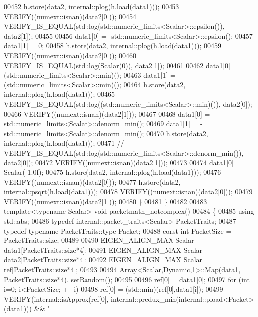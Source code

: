 \begin{DoxyCode}
00452     h.store(data2, internal::plog(h.load(data1)));
00453     VERIFY((numext::isnan)(data2[0]));
00454     VERIFY\_IS\_EQUAL(std::log(std::numeric\_limits<Scalar>::epsilon()), data2[1]);
00455 
00456     data1[0] = -std::numeric\_limits<Scalar>::epsilon();
00457     data1[1] = 0;
00458     h.store(data2, internal::plog(h.load(data1)));
00459     VERIFY((numext::isnan)(data2[0]));
00460     VERIFY\_IS\_EQUAL(std::log(Scalar(0)), data2[1]);
00461 
00462     data1[0] = (std::numeric\_limits<Scalar>::min)();
00463     data1[1] = -(std::numeric\_limits<Scalar>::min)();
00464     h.store(data2, internal::plog(h.load(data1)));
00465     VERIFY\_IS\_EQUAL(std::log((std::numeric\_limits<Scalar>::min)()), data2[0]);
00466     VERIFY((numext::isnan)(data2[1]));
00467 
00468     data1[0] = std::numeric\_limits<Scalar>::denorm\_min();
00469     data1[1] = -std::numeric\_limits<Scalar>::denorm\_min();
00470     h.store(data2, internal::plog(h.load(data1)));
00471     \textcolor{comment}{// VERIFY\_IS\_EQUAL(std::log(std::numeric\_limits<Scalar>::denorm\_min()), data2[0]);}
00472     VERIFY((numext::isnan)(data2[1]));
00473 
00474     data1[0] = Scalar(-1.0f);
00475     h.store(data2, internal::plog(h.load(data1)));
00476     VERIFY((numext::isnan)(data2[0]));
00477     h.store(data2, internal::psqrt(h.load(data1)));
00478     VERIFY((numext::isnan)(data2[0]));
00479     VERIFY((numext::isnan)(data2[1]));
00480   \}
00481 \}
00482 
00483 \textcolor{keyword}{template}<\textcolor{keyword}{typename} Scalar> \textcolor{keywordtype}{void} packetmath\_notcomplex()
00484 \{
00485   \textcolor{keyword}{using} std::abs;
00486   \textcolor{keyword}{typedef} internal::packet\_traits<Scalar> PacketTraits;
00487   \textcolor{keyword}{typedef} \textcolor{keyword}{typename} PacketTraits::type Packet;
00488   \textcolor{keyword}{const} \textcolor{keywordtype}{int} PacketSize = PacketTraits::size;
00489 
00490   EIGEN\_ALIGN\_MAX Scalar data1[PacketTraits::size*4];
00491   EIGEN\_ALIGN\_MAX Scalar data2[PacketTraits::size*4];
00492   EIGEN\_ALIGN\_MAX Scalar ref[PacketTraits::size*4];
00493 
00494   \hyperlink{group___core___module_class_eigen_1_1_array}{Array<Scalar,Dynamic,1>::Map}(data1, PacketTraits::size*4).
      \hyperlink{class_eigen_1_1_plain_object_base_af0e576a0e1aefc9ee346de44cc352ba3}{setRandom}();
00495 
00496   ref[0] = data1[0];
00497   \textcolor{keywordflow}{for} (\textcolor{keywordtype}{int} i=0; i<PacketSize; ++i)
00498     ref[0] = (std::min)(ref[0],data1[i]);
00499   VERIFY(internal::isApprox(ref[0], internal::predux\_min(internal::pload<Packet>(data1))) && \textcolor{stringliteral}{"
}
\end{DoxyCode}
